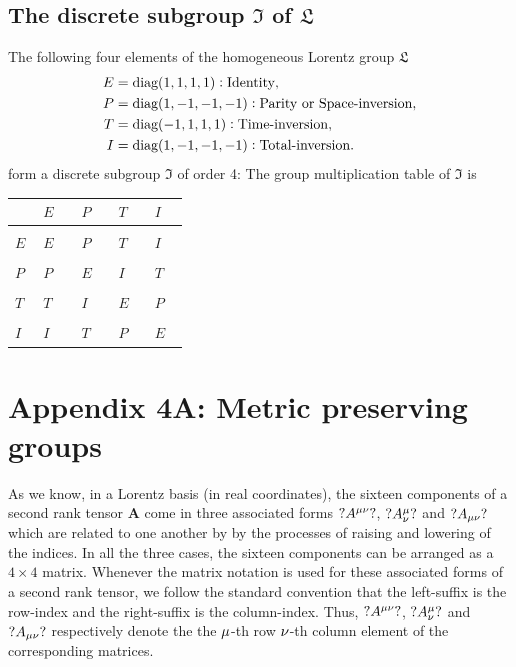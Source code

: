 \begin{small}
\subsection{The discrete subgroup 
{$\mathfrak{I}$}{} of 
{$\mathfrak{L}$}{}} 
The following four elements of the homogeneous Lorentz 
group $\mathfrak{L}$
\begin{align}\label{str.60}
E&=\mbox{diag}(1,1,1,1):   \text{Identity},\\
P&=\mbox{diag}(1,-1,-1,-1):   \text{Parity or 
Space-inversion},\label{str.61}\\
T&=\mbox{diag}(-1,1,1,1) :   
\text{Time-inversion},\label{str.62}\\
I&=\mbox{diag}(1,-1,-1,-1):   
\text{Total-inversion}.\label{str.63}
\end{align}
form a discrete subgroup $\mathfrak{I}$ of order 4: The 
group multiplication table of $\mathfrak{I}$ is

\begin{center}
\begin{tabular}{l|llll}
                     & $E$ & $P$ & $T$ & $I$ \\\hline
                     &		&	   &	       & \\ 
  $E\;$ & $E\quad$ & $P\quad$ & $T\quad$ & $I\quad$ \\\\ 
  $P\;$ & $P$ & $E$ & $I $  & $T$ \\\\ 
  $T\;$ & $T $ & $I $  & $E$ & $P$ \\\\ 
  $I\; $  & $I $  & $T$ & $P$ & $E$
\end{tabular}
\end{center} 
\section*{Appendix 4A: Metric preserving 
groups}

 As we know, in a Lorentz basis (in real 
coordinates), the sixteen components of a second rank 
tensor $\mathbf{A} $ come in three associated forms 
$?A^{{\mu}{\nu}}? $, $?A^{{\mu}}_{{\nu}}? $ and 
$?A_{{\mu}{\nu}}?$ which are related to one another by by the 
processes of raising and lowering of the indices. In all 
the 
three cases, the sixteen components can be arranged as a 
$4\times4$ matrix. Whenever the matrix notation is used for 
these associated forms of a second rank tensor, we follow 
the standard convention that the {left-suffix} is the 
{row-index} and the {right-suffix} is the {column-index}. 
Thus, $?A^{{\mu}{\nu}}? $, $?A^{{\mu}}_{{\nu}}? $ and 
$?A_{{\mu}{\nu}}? $ respectively denote the the ${\mu} $-th 
row ${\nu} $-th column element of the 
corresponding matrices.


\end{small}
